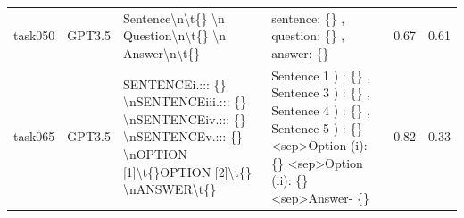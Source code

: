 \begin{longtable}{@{}p{0.8cm\tiny}p{1cm\tiny}p{4.1cm\ttfamily\tiny}p{4.1cm\ttfamily\tiny}p{0.8cm\tiny}p{0.8cm\tiny}@{}}
task050   & GPT3.5    & Sentence\textbackslash{}n\textbackslash{}t\{\} \textbackslash{}n Question\textbackslash{}n\textbackslash{}t\{\} \textbackslash{}n Answer\textbackslash{}n\textbackslash{}t\{\}                                                                                                                                                                                                                                                                                                                                          & sentence: \{\} , question: \{\} , answer: \{\}                                                                                                                                                                                                                                                                                                                                                                                                                                                                                                                                    & 0.67 & 0.61 \\
task065   & GPT3.5    & SENTENCEi.::: \{\} \textbackslash{}nSENTENCEiii.::: \{\} \textbackslash{}nSENTENCEiv.::: \{\} \textbackslash{}nSENTENCEv.::: \{\} \textbackslash{}nOPTION {[}1{]}\textbackslash{}t\{\}OPTION {[}2{]}\textbackslash{}t\{\} \textbackslash{}nANSWER\textbackslash{}t\{\}                                                                                                                                                                                                                                                  & Sentence  1 ) : \{\} ,  Sentence  3 ) : \{\} ,  Sentence  4 ) : \{\} ,  Sentence  5 ) : \{\} \textless{}sep\textgreater Option  (i): \{\} \textless{}sep\textgreater Option  (ii): \{\} \textless{}sep\textgreater Answer- \{\}                                                                                                                                                                                                                                                                                                                                                   & 0.82 & 0.33 \\

\end{longtable}
